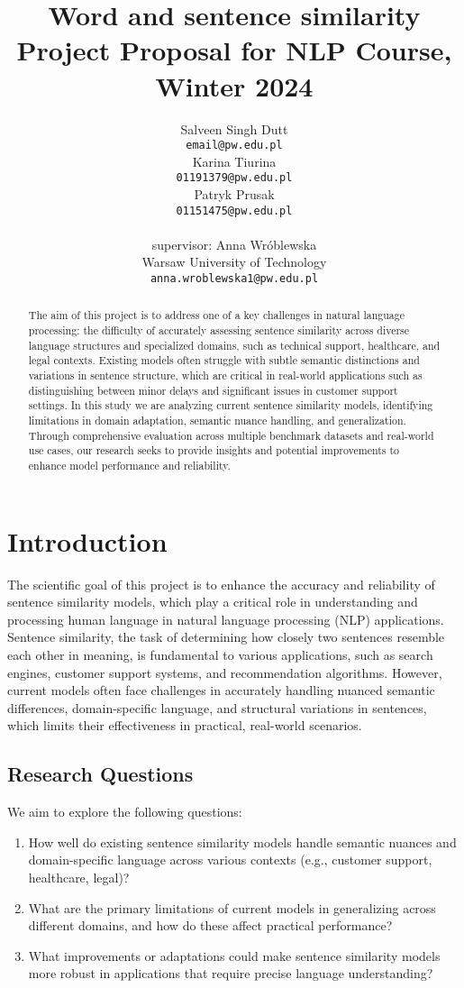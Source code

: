 \documentclass[11pt]{article}
\title{Word and sentence similarity\\Project Proposal for NLP Course, Winter 2024}
\author{Salveen Singh Dutt \\
  {\tt email@pw.edu.pl} \\\And
  Karina Tiurina \\
  {\tt 01191379@pw.edu.pl} \\ \And 
  Patryk Prusak \\
  {\tt 01151475@pw.edu.pl} \\ \\ 
  supervisor: Anna Wróblewska\\
  Warsaw University of Technology \\
  {\tt anna.wroblewska1@pw.edu.pl}}
\date{}
\begin{document}
\maketitle
\begin{abstract}
  The aim of this project is to address one of a key challenges in natural language processing: the difficulty of accurately assessing sentence similarity across diverse language structures and specialized domains, such as technical support, healthcare, and legal contexts. Existing models often struggle with subtle semantic distinctions and variations in sentence structure, which are critical in real-world applications such as distinguishing between minor delays and significant issues in customer support settings. In this study we are analyzing current sentence similarity models, identifying limitations in domain adaptation, semantic nuance handling, and generalization. Through comprehensive evaluation across multiple benchmark datasets and real-world use cases, our research seeks to provide insights and potential improvements to enhance model performance and reliability.
\end{abstract}

\section{Introduction}
The scientific goal of this project is to enhance the accuracy and reliability of sentence similarity models, which play a critical role in understanding and processing human language in natural language processing (NLP) applications. Sentence similarity, the task of determining how closely two sentences resemble each other in meaning, is fundamental to various applications, such as search engines, customer support systems, and recommendation algorithms. However, current models often face challenges in accurately handling nuanced semantic differences, domain-specific language, and structural variations in sentences, which limits their effectiveness in practical, real-world scenarios.

\subsection{Research Questions}
We aim to explore the following questions:
\begin{enumerate}
    \item How well do existing sentence similarity models handle semantic nuances and domain-specific language across various contexts (e.g., customer support, healthcare, legal)?
    \item What are the primary limitations of current models in generalizing across different domains, and how do these affect practical performance?
    \item What improvements or adaptations could make sentence similarity models more robust in applications that require precise language understanding?
\end{enumerate}
\end{document}
